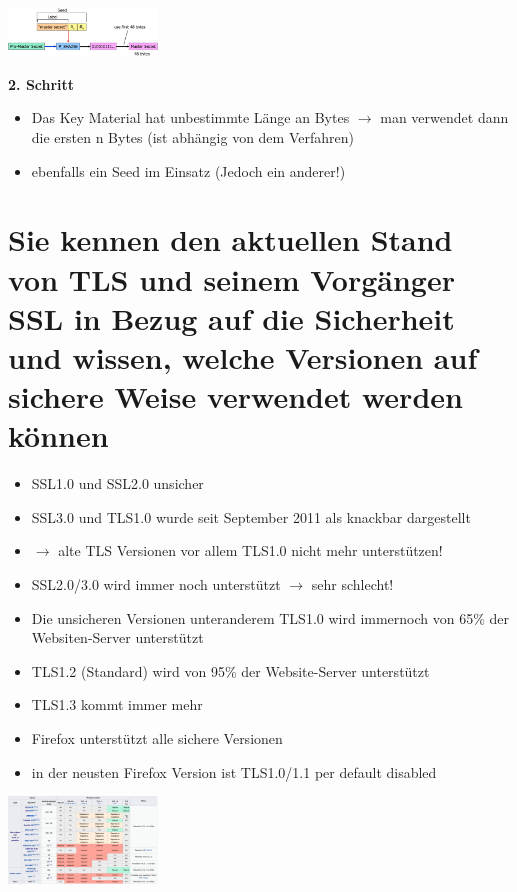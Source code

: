 \documentclass{report}
\newenvironment{Figure}
	{\par\medskip\noindent\minipage{\linewidth}}
	{\endminipage\par\medskip}
\theoremstyle{definition}
\theoremstyle{example}
\begin{document}
\begin{Figure}
\centering
\includegraphics[width=150px]{img/MasterSecretStepI.png}
	\label{fig:Abbildung des ersten Schrittes in der Berechnung des Master Secrets}
\end{Figure}

\textbf{2. Schritt}
\begin{itemize}
	\item Das Key Material hat unbestimmte Länge an Bytes $\rightarrow$ man verwendet dann die ersten n Bytes (ist abhängig von dem Verfahren)
	\item ebenfalls ein Seed im Einsatz (Jedoch ein anderer!)
\end{itemize}

\section{Sie kennen den aktuellen Stand von TLS und seinem Vorgänger SSL in Bezug auf die Sicherheit und wissen, welche Versionen auf sichere Weise verwendet werden können}
\begin{itemize}
	\item SSL1.0 und SSL2.0 unsicher 
	\item SSL3.0 und TLS1.0 wurde seit September 2011 als knackbar dargestellt
	\item $\rightarrow$ alte TLS Versionen vor allem TLS1.0 nicht mehr unterstützen!
	\item SSL2.0/3.0 wird immer noch unterstützt $\rightarrow$ sehr schlecht!
	\item Die unsicheren Versionen unteranderem TLS1.0 wird immernoch von 65\% der Websiten-Server unterstützt
	\item TLS1.2 (Standard) wird von 95\% der Website-Server unterstützt
	\item TLS1.3 kommt immer mehr
	\item Firefox unterstützt alle sichere Versionen
	\item in der neusten Firefox Version ist TLS1.0/1.1 per default disabled
\end{itemize}

\begin{Figure}
\centering
\includegraphics[width=150px]{img/TLSVersions.png}
	\label{fig:Abbildung aktueller Stand des Sicherheitsstandards}
\end{Figure}
\end{document}

